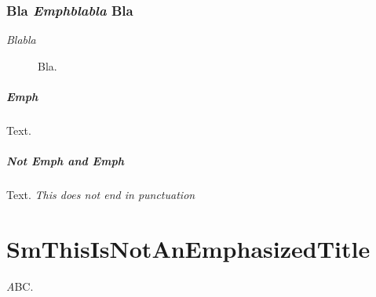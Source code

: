 \subsection{Bla \textit{Emphblabla} Bla}
\label{s:9}
\begin{description}
\item[\emph{Blabla}] Bla.
\end{description}

\paragraph{\emph{Emph}}
Text.

\paragraph{Not Emph and \emph{Emph}}
Text.
\emph{This does not end in punctuation }

\chapter{SmThisIsNotAnEmphasizedTitle}
\label{s:10}
\emph{A}BC.


